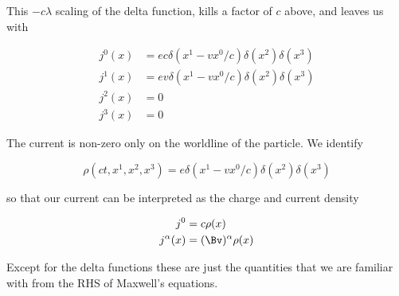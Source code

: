 This \(- c\lambda\) scaling of the delta function, kills a factor of \(c \) above, and leaves us with

\begin{equation}\label{eqn:relativisticElectrodynamicsL12b:530}
\begin{aligned}
j^0(x) &= e c \delta(x^1 - v x^0/c) \delta(x^2) \delta(x^3) \\
j^1(x) &= e v \delta(x^1 - v x^0/c) \delta(x^2) \delta(x^3) \\
j^2(x) &= 0 \\
j^3(x) &= 0 
\end{aligned}
\end{equation}

The current is non-zero only on the worldline of the particle.  We identify

\begin{equation}\label{eqn:relativisticElectrodynamicsL12b:550}
\rho(ct, x^1, x^2, x^3) = e \delta(x^1 - v x^0/c) \delta(x^2) \delta(x^3) 
\end{equation}

so that our current can be interpreted as the charge and current density 

\begin{equation}\label{eqn:relativisticElectrodynamicsL12b:570}
\begin{aligned}
j^0 &= c \rho(x) \\
j^\alpha(x) &= (\Bv)^\alpha \rho(x)
\end{aligned}
\end{equation}

Except for the delta functions these are just the quantities that we are familiar with from the RHS of Maxwell's equations.
